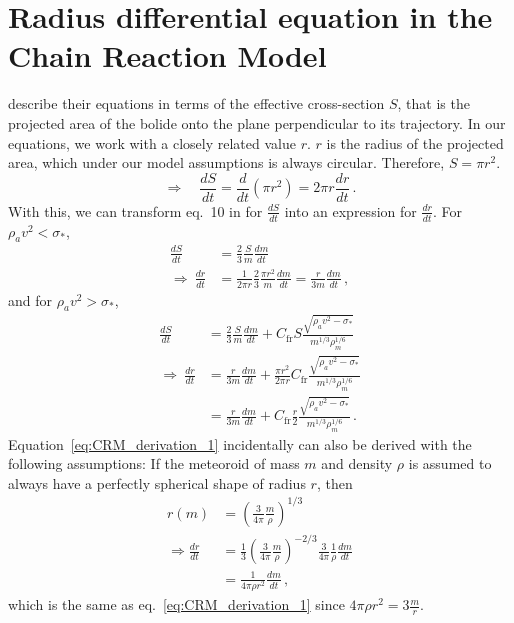 \section{Radius differential equation in the Chain Reaction Model}
\label{sec:CRM_details}
\cite{avramenko2014simulation} describe their equations in terms of the effective cross-section $S$, that is the projected area of the bolide onto the plane perpendicular to its trajectory. In our equations, we work with a closely related value $r$. $r$ is the radius of the projected area, which under our model assumptions is always circular. Therefore, $S = \pi r^2$.
\begin{equation}
    \Rightarrow \quad \frac{dS}{dt} = \frac{d}{dt}\left(\pi r^2\right) = 2\pi r \frac{dr}{dt}\,.
\end{equation}
With this, we can transform eq.~10 in \cite{avramenko2014simulation} for $\frac{dS}{dt}$ into an expression for $\frac{dr}{dt}$.
For $\rho_a v^2 < \sigma_*$,
\begin{align}
    \frac{dS}{dt} &= \frac{2}{3} \frac{S}{m} \frac{dm}{dt} \nonumber\\
    \Rightarrow\ \frac{dr}{dt} &= \frac{1}{2\pi r} \frac{2}{3} \frac{\pi r^2}{m} \frac{dm}{dt} = \frac{r}{3m} \frac{dm}{dt}\,,
    \label{eq:CRM_derivation_1}
\end{align}
and for $\rho_a v^2 > \sigma_*$,
\begin{align}
    \frac{dS}{dt} &= \frac{2}{3} \frac{S}{m} \frac{dm}{dt} + C_\mathrm{fr}S\frac{\sqrt{\rho_a v^2 - \sigma_*}}{m^{1/3}\rho_m^{1/6}} \nonumber\\
    \Rightarrow\ \frac{dr}{dt} &= \frac{r}{3m} \frac{dm}{dt} + \frac{\pi r^2}{2\pi r} C_\mathrm{fr}\frac{\sqrt{\rho_a v^2 - \sigma_*}}{m^{1/3}\rho_m^{1/6}} \nonumber\\
    &= \frac{r}{3m} \frac{dm}{dt} +  C_\mathrm{fr} \frac{r}{2} \frac{\sqrt{\rho_a v^2 - \sigma_*}}{m^{1/3}\rho_m^{1/6}}\,.
\end{align}
Equation~\ref{eq:CRM_derivation_1} incidentally can also be derived with the following assumptions: If the meteoroid of mass $m$ and density $\rho$ is assumed to always have a perfectly spherical shape of radius $r$, then
\begin{align*}
    r(m) &= \left(\frac{3}{4\pi}\frac{m}{\rho}\right)^{1/3} \\
    \Rightarrow \frac{dr}{dt} &= \frac{1}{3}\left(\frac{3}{4\pi}\frac{m}{\rho}\right)^{-2/3}\frac{3}{4\pi}\frac{1}{\rho}\frac{dm}{dt} \\
    &= \frac{1}{4\pi\rho r^2}\frac{dm}{dt}\,,
\end{align*}
which is the same as eq.~\ref{eq:CRM_derivation_1} since $4\pi\rho r^2 = 3\frac{m}{r}$.

